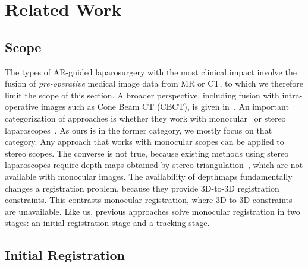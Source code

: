 
\section{Related Work}
\label{sec:sota}
\subsection{Scope}
The types of AR-guided laparosurgery with the most clinical impact involve the fusion of \emph{pre-operative} medical image data from MR or CT, to which we therefore limit the scope of this section.
A broader perspective, including fusion with intra-operative images such as Cone Beam CT (CBCT), is given in~\cite{Bernhardt2017}.
An important categorization of approaches is whether they work with monocular~\cite{affineTracking} or stereo laparoscopes~\cite{21142942,conf/miccai/Amir-KhaliliNPHA13,Cohen2010Prostate,hamarneh2014igrs,haouchine13,Su2009, MaierHein2013}.
As ours is in the former category, we mostly focus on that category.
Any approach that works with monocular scopes can be applied to stereo scopes. The converse is not true, because existing methods using stereo laparoscopes require depth maps obtained by stereo triangulation~\cite{DBLP:conf/miccai/StoyanovSPY10}, which are not available with monocular images.
The availability of depthmaps fundamentally changes a registration problem, because they provide 3D-to-3D registration constraints.
This contrasts monocular registration, where 3D-to-3D constraints are unavailable.
Like us, previous approaches solve monocular registration in two stages: an initial registration stage and a tracking stage.

\subsection{Initial Registration}

